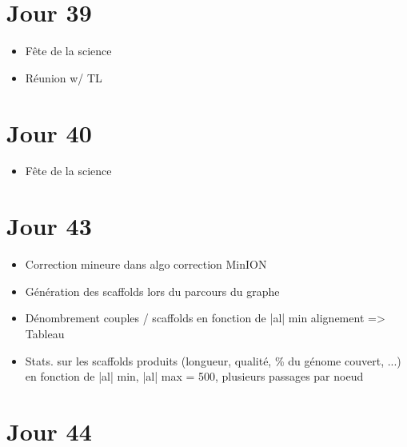 \documentclass[12pt]{report}
\begin{document}
\section{Jour 39}

\begin{itemize}
	\item Fête de la science
	
	\item Réunion w/ TL
\end{itemize}

\section{Jour 40}

\begin{itemize}
	\item Fête de la science
\end{itemize}

\section{Jour 43}

\begin{itemize}
	\item Correction mineure dans algo correction MinION
	
	\item Génération des scaffolds lors du parcours du graphe
	
	\item Dénombrement couples / scaffolds en fonction de |al| min alignement => Tableau
	
	\item Stats. sur les scaffolds produits (longueur, qualité, \% du génome couvert, ...) en fonction de |al| min, |al| max = 500, plusieurs
	passages par noeud
\end{itemize}

\section{Jour 44}
\end{document}
